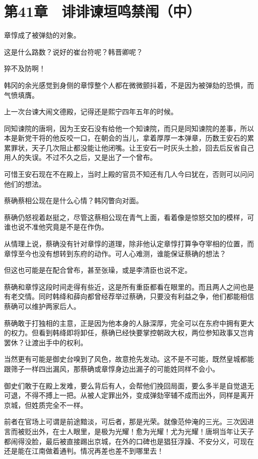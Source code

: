 \section{第41章　诽诽谏垣鸣禁闱（中）}

章惇成了被弹劾的对象。

这是什么路数？说好的崔台符呢？韩晋卿呢？

猝不及防啊！

韩冈的余光感觉到身侧的章惇整个人都在微微颤抖着，不是因为被弹劾的恐惧，而气愤填膺。

上一次台谏大闹文德殿，记得还是熙宁四年五年的时候。

同知谏院的唐坰，因为王安石没有给他一个知谏院，而只是同知谏院的差事，所以本是新党干将的他反咬一口，在朝会的当儿，拿着厚厚一本弹章，历数王安石的累累罪状，天子几次阻止都没能让他闭嘴。让王安石一时灰头土脸，回去后反省自己用人的失误。不过不久之后，又是出了一个曾布。

可惜王安石现在不在殿上，当时上殿的官员不知还有几人今曰犹在，否则可以问问他们的想法。

蔡确蔡相公现在是什么心情？韩冈瞥向对面。

蔡确仍怒视着赵挺之，尽管这蔡相公现在青气上面，看着像是惊怒交加的模样，可谁也说不准他究竟是不是在作伪。

从情理上说，蔡确没有针对章惇的道理，除非他认定章惇打算争夺宰相的位置，而章惇至今也没有想转到东府的动作。可人心难测，谁能保证蔡确的想法？

但这也可能是在配合曾布，甚至张璪，或是李清臣也说不定。

蔡确和章惇这段时间走得有些近，这是所有重臣都看在眼里的。而且两人之间也是有老交情。同时韩绛和薛向都曾经荐举过蔡确，只要没有利益之争，他们都能相信蔡确可以维护两家后人。

蔡确敢于打独相的主意，正是因为他本身的人脉深厚，完全可以在东府中拥有更大的权力。但看到韩绛即将卸任，蔡确已经快要掌控朝政大权，两位参知政事又岂肯罢休？让渡出手中的权利。

当然更有可能是御史台嗅到了风色，故意抢先发动。这不是不可能，既然皇城都能跟筛子一样四出漏风，那蔡确或章惇身边出漏子的可能姓同样不会小。

御史们敢于在殿上发难，要么背后有人，会帮他们挽回局面，要么多半是自觉退无可退，不得不搏上一把。从被人定罪出外，变成弹劾宰辅不成而出外，同样是离开京城，但姓质完全不一样。

前者在官场上可谓是前途黯淡，可后者，那是光荣。就像范仲淹的三光。三次因进言而被贬出外，在士人眼里，是极为光耀！愈为光耀！尤为光耀！唐坰当年让天子都闹得没脸，最后被直接踢出京城，在外的口碑也是猖狂浮躁、不安分义，可现在还是能在江南做着通判。情况再差也差不到哪里去！

